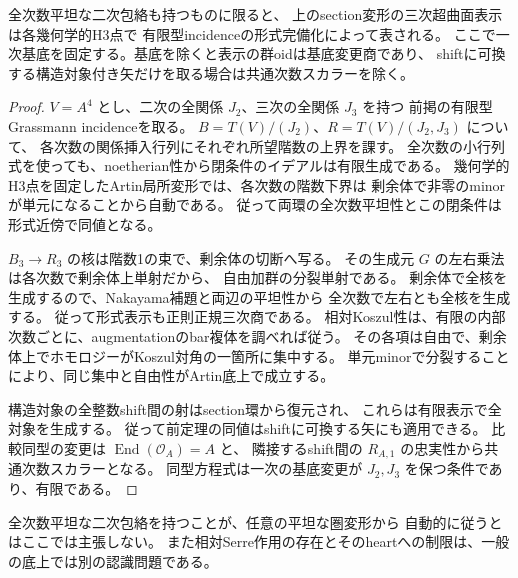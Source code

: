 \begin{corollary}\label{cor:h3-artin-finite-presentation-ring-hull}
全次数平坦な二次包絡も持つものに限ると、
上のsection変形の三次超曲面表示は各幾何学的H3点で
有限型incidenceの形式完備化によって表される。
ここで一次基底を固定する。基底を除くと表示の群oidは基底変更商であり、
shiftに可換する構造対象付き矢だけを取る場合は共通次数スカラーを除く。
\end{corollary}
\begin{proof}
$V=A^4$ とし、二次の全関係 $J_2$、三次の全関係 $J_3$ を持つ
前掲の有限型Grassmann incidenceを取る。
$B=T(V)/(J_2)$、$R=T(V)/(J_2,J_3)$ について、
各次数の関係挿入行列にそれぞれ所望階数の上界を課す。
全次数の小行列式を使っても、noetherian性から閉条件のイデアルは有限生成である。
幾何学的H3点を固定したArtin局所変形では、各次数の階数下界は
剰余体で非零のminorが単元になることから自動である。
従って両環の全次数平坦性とこの閉条件は形式近傍で同値となる。

$B_3\to R_3$ の核は階数1の束で、剰余体の切断へ写る。
その生成元 $G$ の左右乗法は各次数で剰余体上単射だから、
自由加群の分裂単射である。
剰余体で全核を生成するので、Nakayama補題と両辺の平坦性から
全次数で左右とも全核を生成する。
従って形式表示も正則正規三次商である。
相対Koszul性は、有限の内部次数ごとに、augmentationのbar複体を調べれば従う。
その各項は自由で、剰余体上でホモロジーがKoszul対角の一箇所に集中する。
単元minorで分裂することにより、同じ集中と自由性がArtin底上で成立する。

構造対象の全整数shift間の射はsection環から復元され、
これらは有限表示で全対象を生成する。
従って前定理の同値はshiftに可換する矢にも適用できる。
比較同型の変更は $\operatorname{End}(\mathcal O_A)=A$ と、
隣接するshift間の $R_{A,1}$ の忠実性から共通次数スカラーとなる。
同型方程式は一次の基底変更が $J_2,J_3$ を保つ条件であり、有限である。
\end{proof}

全次数平坦な二次包絡を持つことが、任意の平坦な圏変形から
自動的に従うとはここでは主張しない。
また相対Serre作用の存在とそのheartへの制限は、一般の底上では別の認識問題である。

